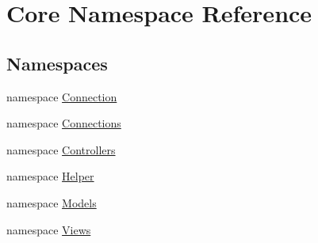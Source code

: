 \hypertarget{namespaceCore}{}\section{Core Namespace Reference}
\label{namespaceCore}
\subsection*{Namespaces}
\begin{DoxyCompactItemize}
\item 
namespace \hyperlink{namespaceCore_1_1Connection}{Connection}
\item 
namespace \hyperlink{namespaceCore_1_1Connections}{Connections}
\item 
namespace \hyperlink{namespaceCore_1_1Controllers}{Controllers}
\item 
namespace \hyperlink{namespaceCore_1_1Helper}{Helper}
\item 
namespace \hyperlink{namespaceCore_1_1Models}{Models}
\item 
namespace \hyperlink{namespaceCore_1_1Views}{Views}
\end{DoxyCompactItemize}

